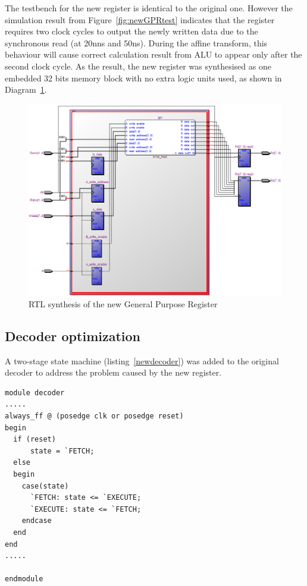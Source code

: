 The testbench for the new register is identical to the original one. However the simulation result from Figure~\ref{fig:newGPRtest} indicates that the register requires two clock cycles to output the newly written data due to the synchronous read (at 20nns and 50ns). During the affine transform, this behaviour will cause correct calculation result from ALU to appear only after the second clock cycle. 
As the result, the new register was synthesised as one embedded 32 bits memory block with no extra logic units used, as shown in Diagram~\ref{fig:newregister}.

\begin{figure}[H]
		\centering
		\includegraphics[width = \textwidth]{Figures/newregs}		
		\caption{RTL synthesis of the new General Purpose Register}
		\label {fig:newregister}
\end{figure}
\newpage

\subsection{Decoder optimization}
A two-stage state machine (listing~\ref{newdecoder}) was added to the original decoder to address the problem caused by the new register. 
\begin{lstlisting}
module decoder
.....
always_ff @ (posedge clk or posedge reset)
begin
  if (reset)
      state = `FETCH;
  else
  begin
    case(state)
      `FETCH: state <= `EXECUTE;
      `EXECUTE: state <= `FETCH;
    endcase
  end
end
.....

endmodule 
\end{lstlisting}

